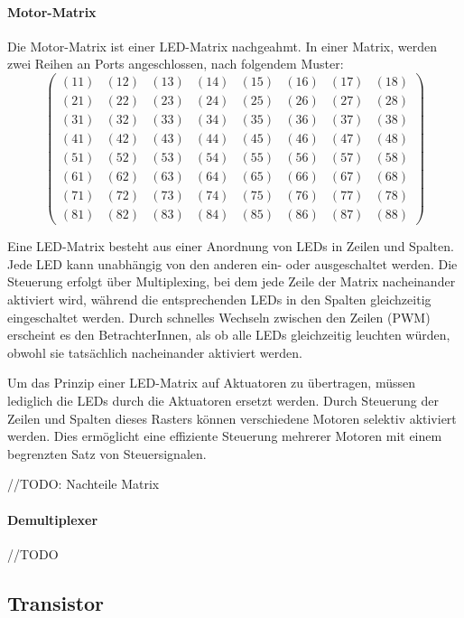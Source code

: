 \paragraph{Motor-Matrix}
Die Motor-Matrix ist einer LED-Matrix nachgeahmt.
In einer Matrix, werden zwei Reihen an Ports angeschlossen, nach folgendem Muster:
$$
\begin{pmatrix}
	(11) & (12) & (13) & (14) & (15) & (16) & (17) & (18) \\
	(21) & (22) & (23) & (24) & (25) & (26) & (27) & (28) \\
	(31) & (32) & (33) & (34) & (35) & (36) & (37) & (38) \\
	(41) & (42) & (43) & (44) & (45) & (46) & (47) & (48) \\
	(51) & (52) & (53) & (54) & (55) & (56) & (57) & (58) \\
	(61) & (62) & (63) & (64) & (65) & (66) & (67) & (68) \\
	(71) & (72) & (73) & (74) & (75) & (76) & (77) & (78) \\
	(81) & (82) & (83) & (84) & (85) & (86) & (87) & (88)
\end{pmatrix}
$$


Eine LED-Matrix besteht aus einer Anordnung von LEDs in Zeilen und Spalten. Jede LED kann unabhängig von den anderen
ein- oder ausgeschaltet werden. Die Steuerung erfolgt über Multiplexing, bei dem jede Zeile der Matrix nacheinander
aktiviert wird, während die entsprechenden LEDs in den Spalten gleichzeitig eingeschaltet werden. Durch schnelles
Wechseln zwischen den Zeilen (PWM) erscheint es den BetrachterInnen, als ob alle LEDs gleichzeitig leuchten würden,
obwohl sie tatsächlich nacheinander aktiviert werden. \newline

Um das Prinzip einer LED-Matrix auf Aktuatoren zu übertragen, müssen lediglich die LEDs durch die Aktuatoren ersetzt werden.
Durch Steuerung der Zeilen und Spalten dieses Rasters können verschiedene Motoren selektiv
aktiviert werden. Dies ermöglicht eine effiziente Steuerung mehrerer Motoren mit einem begrenzten Satz von
Steuersignalen. \newline

//TODO: Nachteile Matrix


\paragraph{Demultiplexer}
//TODO

\subsection{Transistor}
